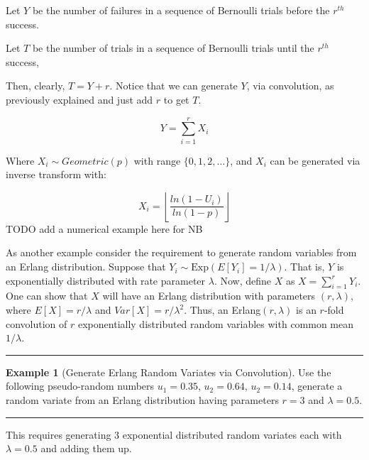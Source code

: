 \documentclass[
]{book}
\theoremstyle{definition}
\theoremstyle{definition}
\newtheorem{example}{Example}[chapter]
\theoremstyle{definition}
\theoremstyle{definition}
\theoremstyle{remark}
\begin{document}
Let \(Y\) be the number of failures in a sequence of Bernoulli trials
before the \(r^{th}\) success.

Let \(T\) be the number of trials in a sequence of Bernoulli trials until
the \(r^{th}\) success,

Then, clearly, \(T = Y + r\). Notice that we can generate \(Y\), via
convolution, as previously explained and just add \(r\) to get \(T\).

\[Y = \sum_{i = 1}^{r}X_{i}\]

Where \(X_{i}\sim Geometric(p)\) with range \(\{0, 1, 2, \dots\}\), and \(X_{i}\)
can be generated via inverse transform with:

\[X_{i} = \left\lfloor \frac{ln(1 - U_{i})}{ln(1 - p)} \right\rfloor\]
TODO add a numerical example here for NB

As another example consider the requirement to generate random variables from an Erlang distribution. Suppose that \(Y_{i} \sim \text{Exp}(E\left[Y_{i}\right]=1/\lambda)\). That is, \(Y\) is
exponentially distributed with rate parameter \(\lambda\). Now, define \(X\)
as \(X = \sum\nolimits_{i=1}^{r} Y_{i}\). One can show that \(X\) will have
an Erlang distribution with parameters \((r,\lambda)\), where
\(E\left[X\right] = r/\lambda\) and \(Var\left[X\right] = r/\lambda^2\). Thus, an
Erlang\((r,\lambda)\) is an \(r\)-fold convolution of \(r\) exponentially
distributed random variables with common mean \(1/\lambda\).

\begin{center}\rule{0.5\linewidth}{0.5pt}\end{center}

\begin{example}[Generate Erlang Random Variates via Convolution]
\protect\hypertarget{exm:GenErlangRV}{}{\label{exm:GenErlangRV} {} }Use the following pseudo-random numbers \(u_{1} = 0.35\), \(u_{2} = 0.64\),
\(u_{2} = 0.14\), generate a random variate from an Erlang distribution
having parameters \(r=3\) and \(\lambda = 0.5\).
\end{example}

\begin{center}\rule{0.5\linewidth}{0.5pt}\end{center}

This requires generating 3 exponential distributed random variates each
with \(\lambda = 0.5\) and adding them up.
\end{document}
